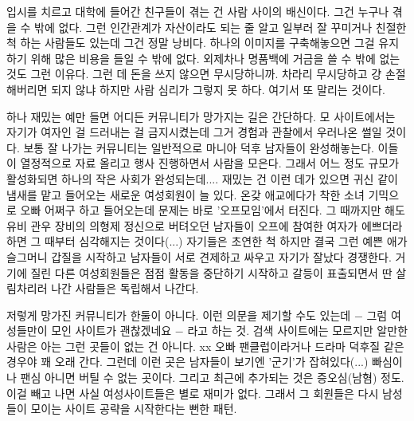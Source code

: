 입시를 치르고 대학에 들어간 친구들이 겪는 건 사람 사이의 배신이다. 그건 누구나 겪을 수 밖에 없다.
그런 인간관계가 자산이라도 되는 줄 알고 일부러 잘 꾸미거나 친절한 척 하는 사람들도 있는데 그건 정말 낭비다.
하나의 이미지를 구축해놓으면 그걸 유지하기 위해 많은 비용을 들일 수 밖에 없다.
외제차나 명품백에 거금을 쓸 수 밖에 없는 것도 그런 이유다. 그런 데 돈을 쓰지 않으면 무시당하니까.
차라리 무시당하고 걍 손절해버리면 되지 않냐 하지만 사람 심리가 그렇지 못 하다. 여기서 또 말리는 것이다.
\vspace{5mm}

하나 재밌는 예만 들면 어디든 커뮤니티가 망가지는 길은 간단하다.
모 사이트에서는 자기가 여자인 걸 드러내는 걸 금지시켰는데 그거 경험과 관찰에서 우러나온 썰일 것이다.
보통 잘 나가는 커뮤니티는 일반적으로 마니아 덕후 남자들이 완성해놓는다. 이들이 열정적으로 자료 올리고 행사 진행하면서 사람을 모은다.
그래서 어느 정도 규모가 활성화되면 하나의 작은 사회가 완성되는데....
재밌는 건 이런 데가 있으면 귀신 같이 냄새를 맡고 들어오는 새로운 여성회원이 늘 있다.
온갖 애교에다가 착한 소녀 기믹으로 오빠 어쩌구 하고 들어오는데 문제는 바로 '오프모임'에서 터진다.
그 때까지만 해도 유비 관우 장비의 의형제 정신으로 버텨오던 남자들이 오프에 참여한 여자가 에쁘더라하면 그 때부터 심각해지는 것이다(...)
자기들은 초연한 척 하지만 결국 그런 예쁜 애가 슬그머니 갑질을 시작하고 남자들이 서로 견제하고 싸우고 자기가 잘났다 경쟁한다.
거기에 질린 다른 여성회원들은 점점 활동을 중단하기 시작하고 갈등이 표출되면서 딴 살림차리러 나간 사람들은 독립해서 나간다.
\vspace{5mm}

저렇게 망가진 커뮤니티가 한둘이 아니다.
이런 의문을 제기할 수도 있는데 $-$ 그럼 여성들만이 모인 사이트가 괜찮겠네요 $-$ 라고 하는 것.
검색 사이트에는 모르지만 알만한 사람은 아는 그런 곳들이 없는 건 아니다.
xx 오빠 팬클럽이라거나 드라마 덕후질 같은 경우야 꽤 오래 간다. 그런데 이런 곳은 남자들이 보기엔 '군기'가 잡혀있다(...)
빠심이나 팬심 아니면 버틸 수 없는 곳이다. 그리고 최근에 추가되는 것은 증오심(남혐) 정도.
이걸 빼고 나면 사실 여성사이트들은 별로 재미가 없다. 그래서 그 회원들은 다시 남성들이 모이는 사이트 공략을 시작한다는 뻔한 패턴.
\vspace{5mm}

